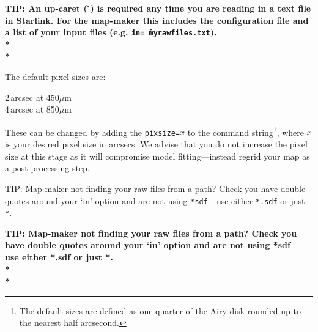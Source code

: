 \documentclass[twoside,11pt]{article}
\newcommand{\htmladdnormallink}[2]{#1}
\newcommand{\htmlref}[2]{#1}
\newenvironment{latexonly}{}{}
\newcommand{\latexhtml}[2]{#1}
\newcommand{\xref}[3]{#1}
\renewcommand{\_}{\texttt{\symbol{95}}}
\newenvironment{fmpage}[1]{\begin{lrbox}{\fmbox}\begin{minipage}{#1}}{\end{minipage}\end{lrbox}\fbox{\usebox{\fmbox}}}
\newcommand{\starlink}{\htmladdnormallink{Starlink}{http://starlink.jach.hawaii.edu}}
\newcommand{\task}[1]{\textsf{#1}}
\newcommand{\makemap}{\xref{\task{makemap}}{sun258}{MAKEMAP}}
\newcommand{\smurfsun}{\xref{\textbf{SUN/258}}{sun258}{}}
\newcommand{\cref}[3]{\latexhtml{#1~\ref{#2}}{\htmlref{#3}{#2}}}
\begin{document}
\begin{htmlonly}
\textbf{TIP: An up-caret (\,\^\,) is required any time you are reading in
a  text file in \starlink. For the map-maker this includes the
configuration file and a list of your input files (e.g. \texttt{in=\^\,myrawfiles.txt}).\\*\\*}
\end{htmlonly}

The default pixel sizes are:

2\,arcsec at 450$\mu$m\\
4\,arcsec at 850$\mu$m

These can be changed by adding the \texttt{pixsize=}$x$ to the
command string\footnote{The default sizes are defined as one quarter
of the Airy disk rounded up to the nearest half arcsecond.}, where $x$
is your desired pixel size in arcsecs. We advise that you do not
increase the pixel size at this stage as it will compromise model
fitting---instead regrid your map as a post-processing step.


\begin{latexonly}
\begin{center}
\begin{fmpage}{0.95\linewidth}
\vspace{0.1cm}
TIP: Map-maker not finding your raw files from a path? Check you have
double quotes around your `in' option and are not using \texttt{*sdf}---use
either \texttt{*.sdf} or just \texttt{*}.
\end{fmpage}
\end{center}
\end{latexonly}

\begin{htmlonly}
\textbf{TIP: Map-maker not finding your raw files from a path? Check
you have double quotes around your `in' option and are not using
*sdf---use either *.sdf or just *.\\*\\*}
\end{htmlonly}
\end{document}
